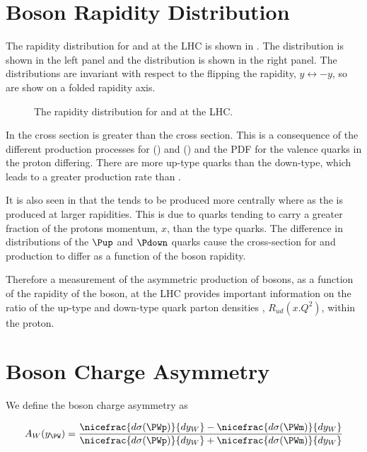 \section{\PW Boson Rapidity Distribution}

The rapidity distribution for \PWp and \PWm at the \ac{LHC} is shown in
. 
The \PWm distribution is shown in the left panel and the \PWp distribution is
shown in the right panel. The distributions are invariant with respect to the
flipping the rapidity, $y\leftrightarrow-y$, so are show on a folded rapidity
axis.

\begin{figure}[htb]
  \centering
  \caption{The rapidity distribution for \PWp and \PWm at the LHC.}
  \label{wbos:wrapid}
\end{figure}

In  the \PWp cross section is greater than the \PWm
cross section. This is a consequence of the different production processes for
\PWp () and \PWm () and the
\ac{PDF} for the valence quarks in the proton differing.
There are more up-type quarks than the down-type, which leads to a greater \PWp
production rate than \PWm.

It is also seen in  that the \PWm tends to be produced
more centrally where as the \PWp is produced at larger rapidities. This is due
to \Pup quarks tending to carry a greater fraction of the protons momentum,
$x$, than the \Pdown type quarks.
The difference in distributions of the $\Pup$ and $\Pdown$ quarks cause the
cross-section for \PWp and \PWm production to differ as a function of the boson
rapidity.

Therefore a measurement of the asymmetric production of \PW bosons, as a
function of the rapidity of the boson, at the \ac{LHC} provides important
information on the ratio of the up-type and down-type quark parton densities ,
$R_{ud}(x.Q^2)$, within the proton. 

\section{\PW Boson Charge Asymmetry}

We define the \PWpm boson charge asymmetry as

\begin{equation}
  A_{W}(y_{\PW})=
    \frac{ 
      \nicefrac{ d\sigma (\PWp) }{ dy_{W} } -
      \nicefrac{ d\sigma (\PWm) }{ dy_{W} }
    }
    {
      \nicefrac{ d\sigma (\PWp) }{ dy_{W} } +
      \nicefrac{ d\sigma (\PWm) }{ dy_{W} }
    }
\label{wbos:wasym}
\end{equation} 

